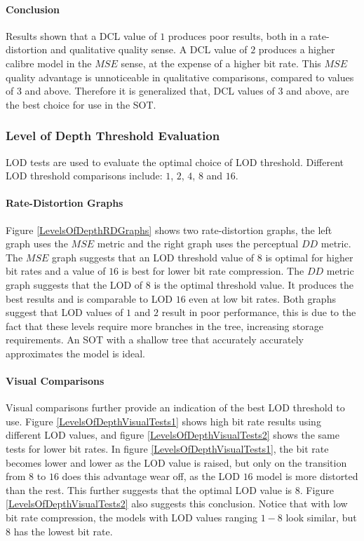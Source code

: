 \paragraph{Conclusion}

Results shown that a DCL value of $1$ produces poor results, both in a rate-distortion and qualitative quality sense. A DCL value of $2$ produces a higher calibre model in the $MSE$ sense, at the expense of a higher bit rate. This $MSE$ quality advantage is unnoticeable in qualitative comparisons, compared to values of $3$ and above. Therefore it is generalized that, DCL values of $3$ and above, are the best choice for use in the SOT.

\subsubsection{Level of Depth Threshold Evaluation}

LOD tests are used to evaluate the optimal choice of LOD threshold. Different LOD threshold comparisons include: $1$, $2$, $4$, $8$ and $16$.

\paragraph{Rate-Distortion Graphs}

Figure \ref{LevelsOfDepthRDGraphs} shows two rate-distortion graphs, the left graph uses the $MSE$ metric and the right graph uses the perceptual $DD$ metric. The $MSE$ graph suggests that an LOD threshold value of $8$ is optimal for higher bit rates and a value of $16$ is best for lower bit rate compression. The $DD$ metric graph suggests that the LOD of $8$ is the optimal threshold value. It produces the best results and is comparable to LOD $16$ even at low bit rates. Both graphs suggest that LOD values of $1$ and $2$ result in poor performance, this is due to the fact that these levels require more branches in the tree, increasing storage requirements. An SOT with a shallow tree that accurately accurately approximates the model is ideal.

\paragraph{Visual Comparisons}


Visual comparisons further provide an indication of the best LOD threshold to use. Figure \ref{LevelsOfDepthVisualTests1} shows high bit rate results using different LOD values, and figure \ref{LevelsOfDepthVisualTests2} shows the same tests for lower bit rates. In figure \ref{LevelsOfDepthVisualTests1}, the bit rate becomes lower and lower as the LOD value is raised, but only on the transition from $8$ to $16$ does this advantage wear off, as the LOD $16$ model is more distorted than the rest. This further suggests that the optimal LOD value is $8$. Figure \ref{LevelsOfDepthVisualTests2} also suggests this conclusion. Notice that with low bit rate compression, the models with LOD values ranging $1-8$ look similar, but $8$ has the lowest bit rate.


